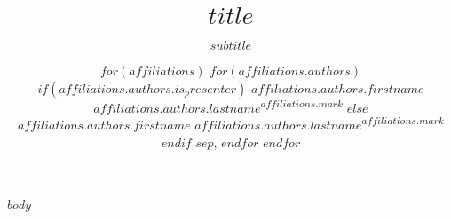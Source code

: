 \documentclass[%
	USenglish,  %
]{beamer}
\title[$short_title$]{$title$}
\subtitle{$subtitle$}
\author[%
$for(affiliations)$
$for(affiliations.authors)$
$if(affiliations.authors.is_presenter)$
$affiliations.authors.firstname$ \textsc{$affiliations.authors.lastname$}
$endif$
$endfor$
$endfor$
]{%
$for(affiliations)$
$for(affiliations.authors)$
$if(affiliations.authors.is_presenter)$
\underline{$affiliations.authors.firstname$ \textsc{$affiliations.authors.lastname$}}\!\textsuperscript{$affiliations.mark$}
$else$
$affiliations.authors.firstname$ \textsc{$affiliations.authors.lastname$}\!\textsuperscript{$affiliations.mark$}
$endif$
$sep$,
$endfor$
$endfor$
}
\institute[
$for(affiliations)$
$affiliations.name$$sep$,
$endfor$
]{
$for(affiliations)$
\textsuperscript{$affiliations.mark$}$affiliations.signature$ \\
$endfor$
}
\date[\talkdate]{\printdate{\talkdate}}
\begin{document}
\begin{frame}[plain]
	\titlepage
\end{frame}

$body$
\end{document}
